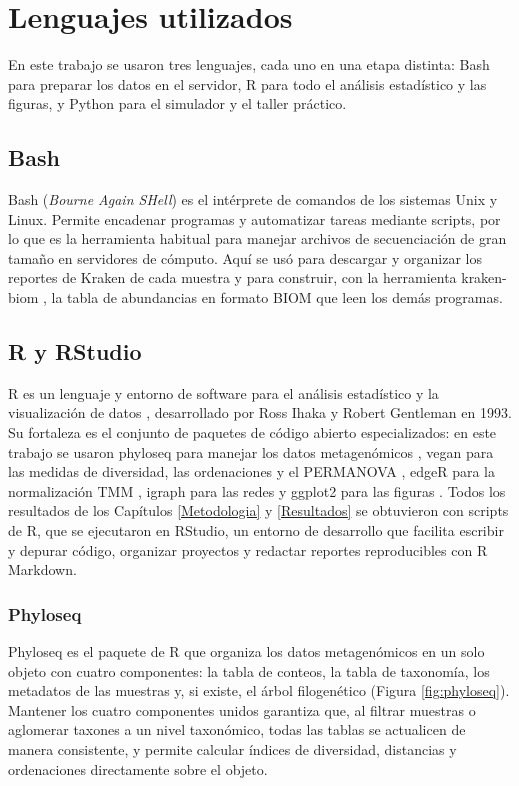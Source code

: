 \section{Lenguajes utilizados}
\label{sec:lenguajes}

En este trabajo se usaron tres lenguajes, cada uno en una etapa distinta: Bash para
preparar los datos en el servidor, R para todo el análisis estadístico y las figuras, y Python
para el simulador y el taller práctico.

\subsection{Bash}
Bash (\emph{Bourne Again SHell}) es el intérprete de comandos de los sistemas Unix y Linux. Permite
encadenar programas y automatizar tareas mediante scripts, por lo que es la herramienta habitual
para manejar archivos de secuenciación de gran tamaño en servidores de cómputo. Aquí se usó para
descargar y organizar los reportes de Kraken de cada muestra y para construir, con la herramienta
kraken-biom \citep{dabdoub2016krakenbiom}, la tabla de abundancias en formato BIOM que leen los
demás programas.

\subsection{R y RStudio}
R es un lenguaje y entorno de software para el análisis estadístico y la visualización de datos
\citep{rcoreteam2023r}, desarrollado por Ross Ihaka y Robert Gentleman en 1993. Su fortaleza es
el conjunto de paquetes de código abierto especializados: en este trabajo se usaron phyloseq para
manejar los datos metagenómicos \citep{mcmurdie2013phyloseq}, vegan para las medidas de diversidad,
las ordenaciones y el PERMANOVA \citep{oksanen2022vegan}, edgeR para la normalización TMM
\citep{robinson2010edger}, igraph para las redes \citep{csardi2006igraph} y ggplot2 para las figuras
\citep{wickham2016ggplot2}. Todos los resultados de los Capítulos \ref{Metodologia} y
\ref{Resultados} se obtuvieron con scripts de R, que se ejecutaron en RStudio, un entorno de
desarrollo que facilita escribir y depurar código, organizar proyectos y redactar reportes
reproducibles con R Markdown.

\subsubsection{Phyloseq}
Phyloseq \citep{mcmurdie2013phyloseq} es el paquete de R que organiza los datos metagenómicos en un
solo objeto con cuatro componentes: la tabla de conteos, la tabla de taxonomía, los metadatos de
las muestras y, si existe, el árbol filogenético (Figura \ref{fig:phyloseq}). Mantener los cuatro
componentes unidos garantiza que, al filtrar muestras o aglomerar taxones a un nivel taxonómico,
todas las tablas se actualicen de manera consistente, y permite calcular índices de diversidad,
distancias y ordenaciones directamente sobre el objeto.

